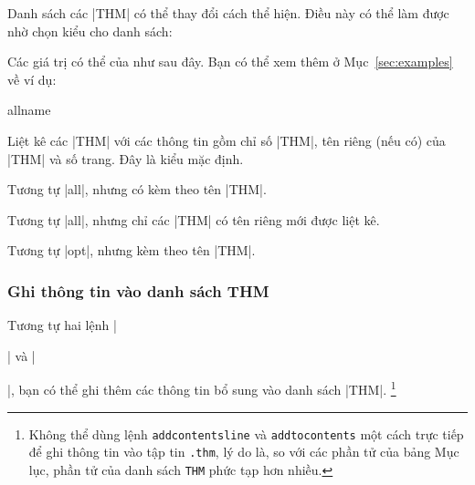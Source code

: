 \begin{theorem}
\begin{thm}
\begin{dinhly}
\begin{dinhly*}
\DescribeMacro\theoremlisttype
Danh sách các |THM| có thể thay đổi cách thể hiện.
Điều này có thể làm được nhờ chọn kiểu cho danh sách:
\begin{command}
\end{command}
Các giá trị có thể của  như sau đây. Bạn có thể
xem thêm ở Mục~\vref{sec:examples} về ví dụ:
\begin{deflist}{allname}
 \item[all]
	Liệt kê các |THM| với các thông tin gồm chỉ số |THM|,
	tên riêng (nếu có) của |THM| và số trang. Đây là kiểu mặc định.
 \item[allname]
	Tương tự |all|, nhưng có kèm theo tên |THM|.
 \item[opt]
	Tương tự |all|, nhưng chỉ các |THM| có tên riêng mới được liệt kê.
 \item[optname]
	Tương tự |opt|, nhưng kèm theo tên |THM|.
\end{deflist}

\subsubsection{Ghi thông tin vào danh sách THM}

Tương tự hai lệnh |\addcontentsline| và |\addtocontents|,
bạn có thể ghi thêm các thông tin bổ sung vào danh sách |THM|.%
\footnote{%
	Không thể dùng lệnh \texttt{\bslash addcontentsline} và \texttt{\bslash addtocontents}
	một cách trực tiếp để ghi thông tin vào tập tin \texttt{.thm},
	lý do là, so với các phần tử của bảng Mục lục, phần tử của danh sách \texttt{THM}
	phức tạp hơn nhiều.%
}


\end{dinhly*}
\end{dinhly}
\end{thm}
\end{theorem}
